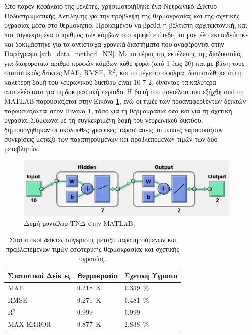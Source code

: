 \documentclass[12pt, a4paper]{report} %
\newcommand{\english}{\foreignlanguage{english}}
\begin{document}
Στο παρόν κεφάλαιο της μελέτης, χρησιμοποιήθηκε ένα Νευρωνικό Δίκτυο Πολυστρωματικής Αντίληψης για την πρόβλεψη της 
θερμοκρασίας και της σχετικής υγρασίας μέσα στο θερμοκήπιο. Προκειμένου να βρεθεί η βέλτιστη αρχιτεκτονική, και πιο 
συγκεκριμένα ο αριθμός των κόμβων στο κρυφό επίπεδο, το μοντέλο εκπαιδεύτηκε και δοκιμάστηκε για τα αντίστοιχα χρονικά 
διαστήματα που αναφέρονται στην Παράγραφο \ref{sub_data_method_NN}. Με το πέρας της εκτέλεσης της διαδικασίας για 
διαφορετικό αριθμό κρυφών κόμβων κάθε φορά (από 1 έως 20) και με βάση τους στατιστικούς δείκτες 
\english{MAE, RMSE, R$^2$}, και το μέγιστο σφάλμα, διαπιστώθηκε ότι η καλύτερη δομή του νευρωνικού δικτύου είναι 10-7-2, 
δίνοντας τα καλύτερα αποτελέσματα για τη δοκιμαστική περίοδο. Η δομή του μοντέλου που εξήχθη από το \english{MATLAB} παρουσιάζεται 
στην Εικόνα \ref{fig_NN_struct_matlab}, ενώ οι τιμές των προαναφερθέντων δεικτών παρουσιάζονται στον Πίνακα 
\ref{tab_result_values}, τόσο για τη θερμοκρασία όσο και για τη σχετική υγρασία. Σύμφωνα με τη συγκεκριμένη δομή του 
νευρωνικού δικτύου, δημιουργήθηκαν οι ακόλουθες γραφικές παραστάσεις, οι οποίες παρουσιάζουν συγκρίσεις μεταξύ των 
παρατηρούμενων και προβλεπόμενων τιμών των δύο μεταβλητών.

\begin{figure}[ht]%
    \centering
    \includegraphics[scale=1.05]{Figures/NN_struct_matlab.jpg}
    \caption{Δομή μοντέλου ΤΝΔ στην \english{MATLAB}.}
    \label{fig_NN_struct_matlab}
\end{figure}

\begin{table}[ht]
    \centering
    \caption{Στατιστικοί δείκτες σύγκρισης μεταξύ παρατηρούμενων και προβλεπόμενων τιμών εσωτερικής θερμοκρασίας και σχετικής υγρασίας.}\label{tab_result_values} 
    \begin{tabular}{>{\centering\arraybackslash}m{4.85cm} >{\centering\arraybackslash}m{4.85cm} >{\centering\arraybackslash}m{4.85cm}}
        \toprule
        \textbf{Στατιστικοί Δείκτες} & \textbf{Θερμοκρασία} & \textbf{Σχετική Υγρασία} \\
        \midrule
        \english{MAE} & \SI{0,218}{\kelvin} & \SI{0,339}{\percent} \\
        \english{RMSE} & \SI{0,271}{\kelvin} & \SI{0,481}{\percent} \\ 
        \english{R$^2$} & \SI{0,999}{} & \SI{0,999}{} \\
        \english{MAX ERROR} & \SI{0,877}{\kelvin} & \SI{2,838}{\percent} \\
        \hline
        \end{tabular}
\end{table}
\end{document}
